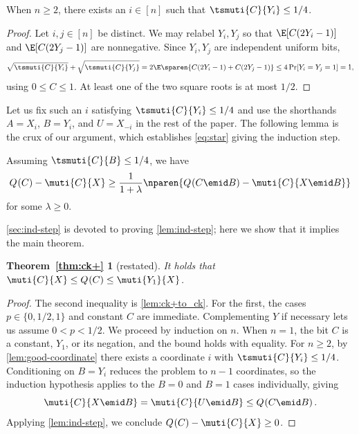 \begin{lemma}
\label{lem:good-coordinate}
When $n\ge2$, there exists an $i\in[n]$ such that
$\tsmuti{C}{Y_i}\le 1/4$.
\end{lemma}
\begin{proof}
Let $i,j\in[n]$ be distinct. We may relabel $Y_i,Y_j$ so that
$\E[C(2Y_i-1)]$ and $\E[C(2Y_j-1)]$ are nonnegative. Since
$Y_i,Y_j$ are independent uniform bits,
\begin{equation*}
  \sqrt{\tsmuti{C}{Y_i}}+\sqrt{\tsmuti{C}{Y_j}}
  =2\E\sparen{C(2Y_i-1)+C(2Y_j-1)}
  \le4\Pr[Y_i=Y_j=1]=1,
\end{equation*}
using $0\le C\le1$. At least one of the two square roots
is at most $1/2$.
\end{proof}
Let us fix such an $i$ satisfying $\tsmuti{C}{Y_i}\le1/4$
and use the shorthands $A=X_i$, $B=Y_i$, and $U= X_{-i}$
in the rest of the paper.
The following lemma is the crux of our argument,
which establishes \eqref{eq:star} giving the induction step.
\begin{lemma}
\label{lem:ind-step}
Assuming $\tsmuti{C}{B}\le1/4$, we have
\begin{align*}
  \qent{C} - \muti{C}{X} \ge \frac{1}{1+ \lambda}
  \nparen{\qent{C\emid B}-\muti{C}{X\emid B}}
\end{align*}
for some $\lambda\ge 0$.
\end{lemma}
\autoref{sec:ind-step} is devoted to proving \autoref{lem:ind-step};
here we show that it implies the main theorem.
\begingroup
\newtheorem*{restatedtheorem}{Theorem~\ref{thm:ck+}}
\begin{restatedtheorem}[restated]
It holds that $\muti{C}{X}\le \qent{C}\le\muti{Y_1}{X}$.
\end{restatedtheorem}
\endgroup
\begin{proof}
The second inequality is \autoref{lem:ck+to_ck}.
For the first, the cases $p\in\{0,1/2,1\}$ and constant $C$
are immediate. Complementing $Y$ if necessary lets us assume
$0<p<1/2$. We proceed by induction on $n$.
When $n=1$, the bit $C$ is a constant, $Y_1$, or its negation,
and the bound holds with equality.
For $n\ge2$, by \autoref{lem:good-coordinate} there exists a coordinate
$i$ with $\tsmuti{C}{Y_i}\le1/4$.
Conditioning on $B=Y_i$ reduces the problem to $n-1$ coordinates,
so the induction hypothesis applies to the $B=0$ and $B=1$ cases
individually, giving
\begin{equation*}
  \muti{C}{X\emid B}=\muti{C}{U\emid B}
  \le\qent{C\emid B}.
\end{equation*}
Applying \autoref{lem:ind-step}, we conclude
$\qent{C}-\muti{C}{X}\ge0$.
\end{proof}

